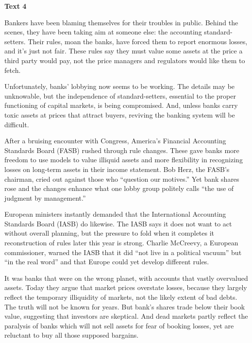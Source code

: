 \begin{center}\textbf{Text 4}\end{center}

\qquad Bankers have been blaming themselves for their troubles in public. Behind the scenes, they have been taking aim at someone else: the accounting standard-setters. Their rules, moan the banks, have forced them to report enormous losses, and it's just not fair. These rules say they must value some assets at the price a third party would pay, not the price managers and regulators would like them to fetch.

\qquad Unfortunately, banks' lobbying now seems to be working. The details may be unknowable, but the independence of standard-setters, essential to the proper functioning of capital markets, is being compromised. And, unless banks carry toxic assets at prices that attract buyers, reviving the banking system will be difficult.

\qquad After a bruising encounter with Congress, America's Financial Accounting Standards Board (FASB) rushed through rule changes. These gave banks more freedom to use models to value illiquid assets and more flexibility in recognizing losses on long-term assets in their income statement. Bob Herz, the FASB's chairman, cried out against those who ``question our motives.'' Yet bank shares rose and the changes enhance what one lobby group politely calls ``the use of judgment by management.''

\qquad European ministers instantly demanded that the International Accounting Standards Board (IASB) do likewise. The IASB says it does not want to act without overall planning, but the pressure to fold when it completes it reconstruction of rules later this year is strong. Charlie McCreevy, a European commissioner, warned the IASB that it did ``not live in a political vacuum'' but ``in the real word'' and that Europe could yet develop different rules.

\qquad It was banks that were on the wrong planet, with accounts that vastly overvalued assets. Today they argue that market prices overstate losses, because they largely reflect the temporary illiquidity of markets, not the likely extent of bad debts. The truth will not be known for years. But bank's shares trade below their book value, suggesting that investors are skeptical. And dead markets partly reflect the paralysis of banks which will not sell assets for fear of booking losses, yet are reluctant to buy all those supposed bargains.

